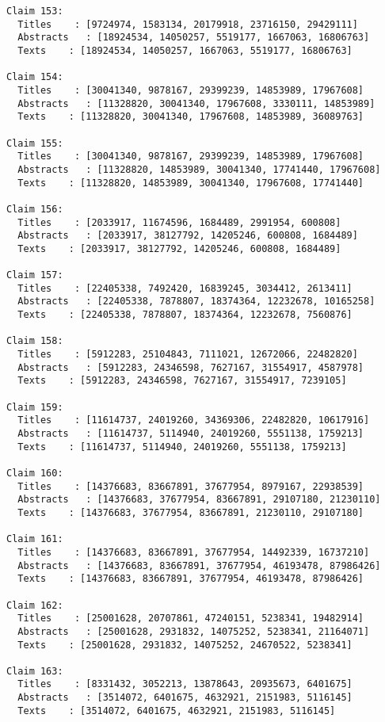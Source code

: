 \documentclass[11pt]{article}
\begin{document}
\begin{Verbatim}[commandchars=\\\{\}]
Claim 153:
  Titles    : [9724974, 1583134, 20179918, 23716150, 29429111]
  Abstracts   : [18924534, 14050257, 5519177, 1667063, 16806763]
  Texts    : [18924534, 14050257, 1667063, 5519177, 16806763]

Claim 154:
  Titles    : [30041340, 9878167, 29399239, 14853989, 17967608]
  Abstracts   : [11328820, 30041340, 17967608, 3330111, 14853989]
  Texts    : [11328820, 30041340, 17967608, 14853989, 36089763]

Claim 155:
  Titles    : [30041340, 9878167, 29399239, 14853989, 17967608]
  Abstracts   : [11328820, 14853989, 30041340, 17741440, 17967608]
  Texts    : [11328820, 14853989, 30041340, 17967608, 17741440]

Claim 156:
  Titles    : [2033917, 11674596, 1684489, 2991954, 600808]
  Abstracts   : [2033917, 38127792, 14205246, 600808, 1684489]
  Texts    : [2033917, 38127792, 14205246, 600808, 1684489]

Claim 157:
  Titles    : [22405338, 7492420, 16839245, 3034412, 2613411]
  Abstracts   : [22405338, 7878807, 18374364, 12232678, 10165258]
  Texts    : [22405338, 7878807, 18374364, 12232678, 7560876]

Claim 158:
  Titles    : [5912283, 25104843, 7111021, 12672066, 22482820]
  Abstracts   : [5912283, 24346598, 7627167, 31554917, 4587978]
  Texts    : [5912283, 24346598, 7627167, 31554917, 7239105]

Claim 159:
  Titles    : [11614737, 24019260, 34369306, 22482820, 10617916]
  Abstracts   : [11614737, 5114940, 24019260, 5551138, 1759213]
  Texts    : [11614737, 5114940, 24019260, 5551138, 1759213]

Claim 160:
  Titles    : [14376683, 83667891, 37677954, 8979167, 22938539]
  Abstracts   : [14376683, 37677954, 83667891, 29107180, 21230110]
  Texts    : [14376683, 37677954, 83667891, 21230110, 29107180]

Claim 161:
  Titles    : [14376683, 83667891, 37677954, 14492339, 16737210]
  Abstracts   : [14376683, 83667891, 37677954, 46193478, 87986426]
  Texts    : [14376683, 83667891, 37677954, 46193478, 87986426]

Claim 162:
  Titles    : [25001628, 20707861, 47240151, 5238341, 19482914]
  Abstracts   : [25001628, 2931832, 14075252, 5238341, 21164071]
  Texts    : [25001628, 2931832, 14075252, 24670522, 5238341]

Claim 163:
  Titles    : [8331432, 3052213, 13878643, 20935673, 6401675]
  Abstracts   : [3514072, 6401675, 4632921, 2151983, 5116145]
  Texts    : [3514072, 6401675, 4632921, 2151983, 5116145]


\end{Verbatim}
\end{document}
